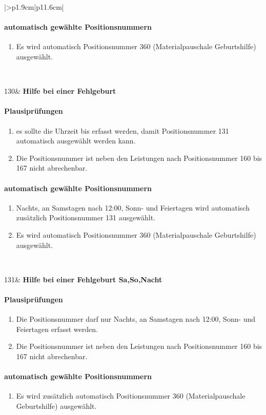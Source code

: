 \begin{mpsupertabular}{|>{\centering}p{1.9cm}|p{11.6cm}|}
\paragraph{automatisch gewählte Positionsnummern}
\begin{enumerate}
\item
Es wird automatisch Positionsnummer 360 (Materialpauschale Geburtshilfe)
ausgewählt.
\end{enumerate}
\\ \hline


130&
\textbf{Hilfe bei einer Fehlgeburt}
\paragraph{Plausiprüfungen}
\begin{enumerate}
\item
es sollte die Uhrzeit bis erfasst werden, damit Positionsnummer 131 
automatisch ausgewählt werden kann.
\item
Die Positionsnummer ist neben den Leistungen nach Positionsnummer 160 bis
167 nicht abrechenbar.
\end{enumerate}
\paragraph{automatisch gewählte Positionsnummern}
\begin{enumerate}
\item
Nachts, an Samstagen nach 12:00, Sonn- und Feiertagen wird automatisch 
zusätzlich Positionsnummer 131 ausgewählt.
\item
Es wird automatisch Positionsnummer 360 (Materialpauschale Geburtshilfe)
ausgewählt.
\end{enumerate}
\\ \hline



131&
\textbf{Hilfe bei einer Fehlgeburt Sa,So,Nacht}
\paragraph{Plausiprüfungen}
\begin{enumerate}
\item
Die Positionsnummer darf nur Nachts, an Samstagen nach 12:00, 
Sonn- und Feiertagen erfasst werden.
\item
Die Positionsnummer ist neben den Leistungen nach Positionsnummer 160 bis
167 nicht abrechenbar.
\end{enumerate}
\paragraph{automatisch gewählte Positionsnummern}
\begin{enumerate}
\item
Es wird zusätzlich automatisch Positionsnummer 360 (Materialpauschale 
Geburtshilfe) ausgewählt.
\end{enumerate}
\\ \hline




\end{mpsupertabular}
